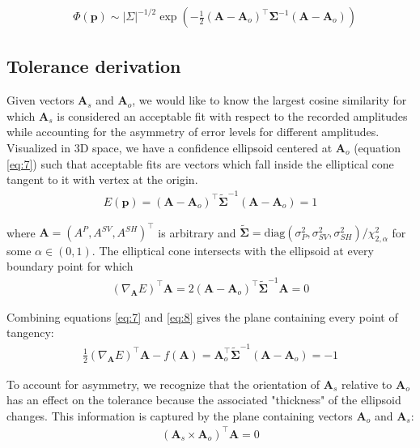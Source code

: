 \documentclass[preprint]{seismica}
\begin{document}
    \begin{align} \label{eq:6}
      &\Phi(\bm{p}) \sim |\Sigma|^{-1/2} \exp \left( - \frac{1}{2} (\bm{A} - \bm{A}_o)^\top \bm{\Sigma}^{-1} (\bm{A} - \bm{A}_o) \right)
    \end{align}

  \subsection{Tolerance derivation}
    Given vectors $\bm{A}_s$ and $\bm{A}_o$, we would like to know the largest cosine
    similarity for which $\bm{A}_s$ is considered an acceptable fit with respect to the recorded amplitudes
    while accounting for the asymmetry of error levels for different amplitudes. Visualized in 3D
    space, we have a confidence ellipsoid centered at $\bm{A}_o$ (equation \ref{eq:7}) such that
    acceptable fits are vectors which fall inside the elliptical cone tangent to it with vertex at the
    origin.
    \begin{align} \label{eq:7}
      E(\bm{p}) = (\bm{A} - \bm{A}_o)^\top \tilde{\bm{\Sigma}}^{-1} (\bm{A} - \bm{A}_o)  = 1
    \end{align}
    
    \noindent where $\bm{A} = (A^P, A^{SV}, A^{SH})^\top$ is arbitrary
    and $\tilde{\bm{\Sigma}} = \text{diag}(\sigma_P^2, \sigma_{SV}^2, \sigma_{SH}^2)/\chi^2_{2,\alpha}$ for some $\alpha \in (0,1)$. The elliptical
    cone intersects with the ellipsoid at every boundary point for which
    \begin{align} \label{eq:8}
      (\nabla_{\bm{A}} E)^\top \bm{A} = 2(\bm{A} - \bm{A}_o)^\top \tilde{\bm{\Sigma}}^{-1} \bm{A} = 0
    \end{align}
    
    Combining equations \ref{eq:7} and \ref{eq:8} gives the plane containing every point of 
    tangency:
    \begin{align} \label{eq:9}
      \frac{1}{2} (\nabla_{\bm{A}} E)^\top \bm{A} - f(\bm{A}) = 
              \bm{A}_o^\top \tilde{\bm{\Sigma}}^{-1} (\bm{A} - \bm{A}_o)  = -1
    \end{align}

    To account for asymmetry, we recognize that the orientation of $\bm{A}_s$ relative to $\bm{A}_o$
    has an effect on the tolerance because the associated "thickness" of the ellipsoid changes.
    This information is captured by the plane containing vectors $\bm{A}_o$ and $\bm{A}_s$:
    \begin{align} \label{eq:10}
      (\bm{A}_s \times \bm{A}_o)^\top \bm{A} = 0
    \end{align}
\end{document}
